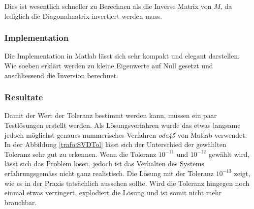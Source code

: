\begin{refsection}
Dies ist wesentlich schneller zu Berechnen als die Inverse Matrix von $M$, da lediglich die Diagonalmatrix invertiert werden muss.

\subsubsection{Implementation}
Die Implementation in Matlab lässt sich sehr kompakt und elegant darstellen. Wie soeben erklärt werden zu kleine Eigenwerte auf Null gesetzt und anschliessend die Inversion berechnet. 

{\scriptsize }

\subsubsection{Resultate}
Damit der Wert der Toleranz bestimmt werden kann, müssen ein paar Testlösungen erstellt werden. Als Lösungsverfahren wurde das etwas langsame jedoch möglichst genaues nummerisches Verfahren \textit{ode45} von Matlab verwendet. In der Abbildung \ref{trafo:SVDTol} lässt sich der Unterschied der gewählten Toleranz sehr gut zu erkennen. Wenn die Toleranz $10^{-11}$ und $10^{-12}$ gewählt wird, lässt sich das Problem lösen, jedoch ist das Verhalten des Systems erfahrungsgemäss nicht ganz realistisch. Die Lösung mit der Toleranz $10^{-13}$ zeigt, wie es in der Praxis tatsächlich aussehen sollte. Wird die Toleranz hingegen noch einmal etwas verringert, explodiert die Lösung und ist somit nicht mehr brauchbar.


\end{refsection}

